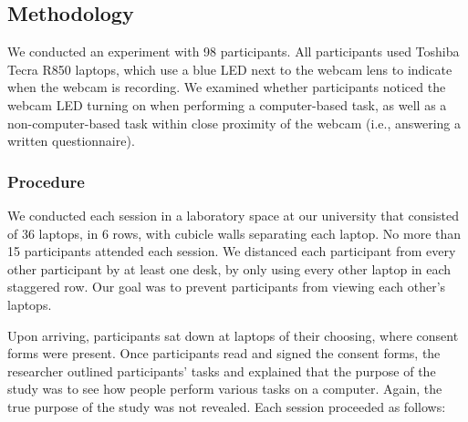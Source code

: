 \documentclass{sigchi}
\begin{document}
\subsection{Methodology}
We conducted an experiment with 98 participants.  All participants used Toshiba Tecra R850 laptops, which use a blue LED next to the webcam lens to indicate when the webcam is recording. We examined whether participants noticed the webcam LED turning on when performing a computer-based task, as well as a non-computer-based task within close proximity of the webcam (i.e., answering a written questionnaire). %

\subsubsection{Procedure}
We conducted each session in a laboratory space at our university that consisted of 36 laptops, in 6 rows, with cubicle walls separating each laptop. No more than 15 participants attended each session. We distanced each participant from every other participant by at least one desk, by only using every other laptop in each staggered row. Our goal was to prevent participants from viewing each other's laptops.

Upon arriving, participants sat down at laptops of their choosing, where consent forms were present. Once participants read and signed the consent forms, the researcher outlined participants' tasks and explained that the purpose of the study was to see how people perform various tasks on a computer. Again, the true purpose of the study was not revealed. Each session proceeded as follows:
\end{document}
